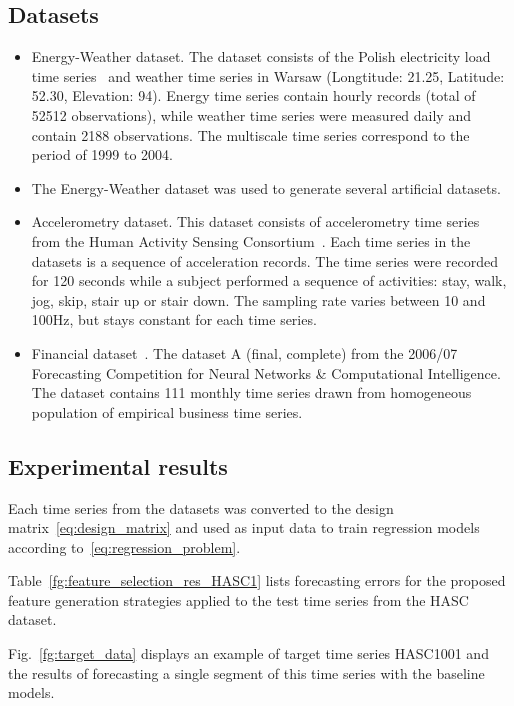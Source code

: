 \documentclass[conference]{IEEEtran}
\begin{document}
\subsection{Datasets}
\begin{itemize}
\item Energy-Weather dataset. The dataset consists of the Polish electricity load time series~\cite{EnergyWeatherData} and weather time series in Warsaw (Longtitude: 21.25, Latitude: 52.30, Elevation: 94). Energy time series contain hourly records (total of 52512 observations), while weather time series were measured daily and contain 2188 observations. The multiscale time series correspond to the period of 1999 to 2004.
    
\item  The Energy-Weather dataset was used to generate several artificial datasets. 

\item Accelerometry dataset. This dataset consists of accelerometry time series from the Human Activity Sensing Consortium~\cite{HASCdata}. Each time series in the datasets is a sequence of acceleration records. The time series were recorded for 120 seconds while a subject performed a sequence of activities: stay, walk, jog, skip, stair up or stair down. The sampling rate varies between 10 and 100Hz, but stays constant for each time series.
\item Financial dataset~\cite{NNcompetition}.  The dataset A (final, complete) from the 2006/07 Forecasting Competition for Neural Networks \& Computational Intelligence. The dataset contains 111 monthly time series drawn from homogeneous population of empirical business time series.
\end{itemize}

\subsection{Experimental results}
Each time series from the datasets was converted to the design matrix~\eqref{eq:design_matrix} and used as input data to train regression models according to~\eqref{eq:regression_problem}.

Table~\ref{fg:feature_selection_res_HASC1} lists forecasting errors for the proposed feature generation strategies applied to the test time series from the HASC dataset.

Fig.~\ref{fg:target_data} displays an example of target time series HASC1001 and the results of forecasting a single segment of this time series with the baseline models.
\end{document}
